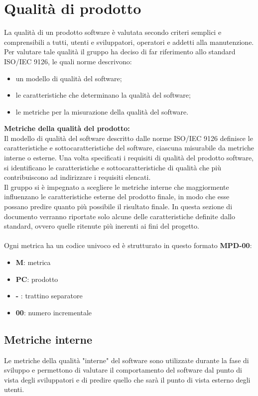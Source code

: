 \section{Qualità di prodotto}
La qualità di un prodotto software è valutata secondo criteri semplici e comprensibili a tutti, utenti e sviluppatori, operatori e addetti alla manutenzione.
Per valutare tale qualità il gruppo \Gruppo ha deciso di far riferimento allo standard ISO/IEC 9126, le quali norme descrivono:
\begin{itemize}
\item un modello di qualità del software; 
\item le caratteristiche che determinano la qualità del software;
\item le metriche per la misurazione della qualità del software.
\end{itemize}

\textbf{Metriche della qualità del prodotto:}\\
Il modello di qualità del software descritto dalle norme ISO/IEC 9126 definisce le caratteristiche e sottocaratteristiche del software, ciascuna misurabile da metriche interne o esterne.
Una volta specificati i requisiti di qualità del prodotto software, si identificano le caratteristiche e sottocaratteristiche di qualità che più contribuiscono ad indirizzare i requisiti elencati.\\
Il gruppo \Gruppo si è impegnato a scegliere le metriche interne che maggiormente influenzano le caratteristiche esterne del prodotto finale, in modo che esse possano predire quanto più possibile il risultato finale.
In questa sezione di documento verranno riportate solo alcune delle caratteristiche definite dallo standard, ovvero quelle ritenute più inerenti ai fini del progetto.\\ \\
Ogni metrica ha un codice univoco ed è strutturato in questo formato \textbf{MPD-00}:
\begin{itemize}
    \item \textbf{M}: metrica
    \item \textbf{PC}: prodotto
    \item \textbf{-} : trattino separatore
    \item \textbf{00}: numero incrementale
\end{itemize}
\subsection{Metriche interne}
 Le metriche della qualità "interne" del software sono utilizzate durante la fase di sviluppo e permettono di valutare il comportamento del software dal punto di vista degli sviluppatori e di predire quello che sarà il punto di vista esterno degli utenti.
